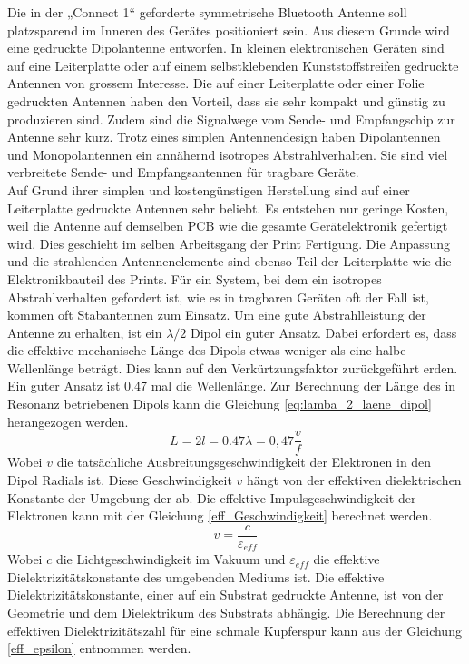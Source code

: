Die in der „Connect  1“ geforderte symmetrische Bluetooth Antenne soll   platzsparend im Inneren des Gerätes positioniert sein. Aus diesem Grunde wird eine gedruckte Dipolantenne entworfen. In kleinen  elektronischen Geräten sind auf eine Leiterplatte oder auf einem selbstklebenden Kunststoffstreifen gedruckte Antennen  von grossem Interesse. Die auf einer Leiterplatte oder einer Folie gedruckten Antennen haben den Vorteil, dass sie sehr kompakt und günstig zu produzieren sind. Zudem sind die Signalwege vom Sende- und Empfangschip zur Antenne sehr kurz. Trotz eines simplen Antennendesign haben Dipolantennen und Monopolantennen ein annähernd isotropes Abstrahlverhalten. Sie sind viel verbreitete Sende- und Empfangsantennen für tragbare Geräte. \\

Auf Grund ihrer simplen und kostengünstigen  Herstellung sind auf  einer Leiterplatte gedruckte Antennen sehr beliebt. Es entstehen nur geringe Kosten, weil die Antenne auf demselben PCB wie die gesamte Gerätelektronik gefertigt wird. Dies geschieht im selben Arbeitsgang der Print Fertigung. Die  Anpassung und die strahlenden  Antennenelemente sind ebenso Teil der Leiterplatte wie die Elektronikbauteil des Prints. Für ein System, bei dem ein isotropes Abstrahlverhalten gefordert ist, wie es in tragbaren Geräten oft der Fall ist, kommen oft Stabantennen zum Einsatz. 
Um eine gute Abstrahlleistung der Antenne zu erhalten, ist ein $\lambda /2$ Dipol ein guter Ansatz. Dabei erfordert es, dass die effektive mechanische Länge des Dipols etwas weniger als eine halbe Wellenlänge beträgt. Dies kann auf den Verkürtzungsfaktor zurückgeführt erden. Ein guter Ansatz ist 0.47 mal die Wellenlänge. 
Zur Berechnung der Länge des in Resonanz betriebenen Dipols kann die  Gleichung \ref{eq:lamba_2_laene_dipol} herangezogen werden.
\begin{equation}\label{eq:lamba_2_laene_dipol}
L=2l = 0.47 \lambda= 0,47 \dfrac{v}{f}
\end{equation} 
Wobei $v$ die tatsächliche Ausbreitungsgeschwindigkeit der Elektronen in den Dipol Radials ist. Diese Geschwindigkeit $v$ hängt von der effektiven dielektrischen Konstante der Umgebung der ab. 
Die effektive  Impulsgeschwindigkeit der Elektronen kann mit der Gleichung \ref{eff_Geschwindigkeit} berechnet werden. 
\begin{equation}\label{eff_Geschwindigkeit}
v = \dfrac{c}{\varepsilon_{eff}}
\end{equation}
Wobei $c$ die Lichtgeschwindigkeit im Vakuum und $\varepsilon_{eff}$  die effektive Dielektrizitätskonstante des umgebenden Mediums ist. Die effektive Dielektrizitätskonstante, einer auf ein Substrat gedruckte Antenne, ist von der  Geometrie und dem Dielektrikum des Substrats abhängig. Die Berechnung der effektiven Dielektrizitätszahl für eine schmale Kupferspur kann aus der Gleichung \ref{eff_epsilon} entnommen werden. 

